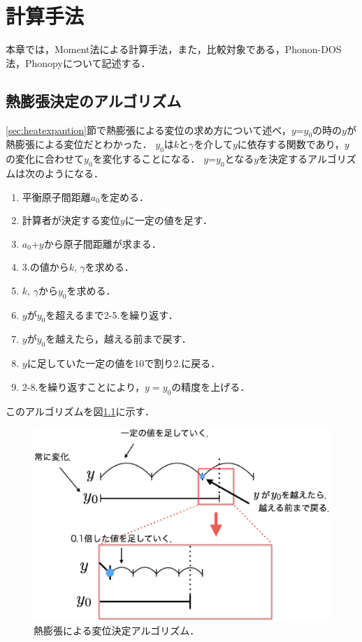 \chapter{計算手法}
本章では，Moment法による計算手法，また，比較対象である，Phonon-DOS法，Phonopyについて記述する．

\section{熱膨張決定のアルゴリズム}
\ref{sec:heatexpantion}節で熱膨張による変位の求め方について述べ，$y$=$y_0$の時の$y$が熱膨張による変位だとわかった．
$y_0$は$k$と$\gamma$を介して$y$に依存する関数であり，$y$の変化に合わせて$y_0$を変化することになる．
$y$=$y_0$となる$y$を決定するアルゴリズムは次のようになる．
\begin{enumerate}
 \item 平衡原子間距離$a_0$を定める．
 \item 計算者が決定する変位$y$に一定の値を足す．
 \item $a_0$+$y$から原子間距離が求まる．
 \item 3.の値から$k$, $\gamma$を求める．
 \item $k$, $\gamma$から$y_0$を求める．
 \item $y$が$y_0$を超えるまで2-5.を繰り返す．
 \item $y$が$y_0$を越えたら，越える前まで戻す．
 \item $y$に足していた一定の値を10で割り2.に戻る．
 \item 2-8.を繰り返すことにより，$y=y_0$の精度を上げる．
\end{enumerate}
このアルゴリズムを図\ref{fig:algo}に示す．
\begin{figure}[htbp]
 \begin{center}
  \includegraphics[width=130mm]{../image/fig2.eps}
 \end{center}
 \caption{熱膨張による変位決定アルゴリズム．}
 \label{fig:algo}
\end{figure}

